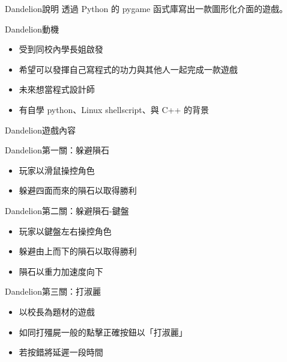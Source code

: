 \documentclass{article}
\begin{document}

\begin{large}
\begin{boxpar}{Dandelion}{說明}
透過 Python 的 pygame 函式庫寫出一款圖形化介面的遊戲。
\end{boxpar}
\begin{boxpar}{Dandelion}{動機}
    \begin{itemize}
\item 受到同校內學長姐啟發
\item 希望可以發揮自己寫程式的功力與其他人一起完成一款遊戲
\item 未來想當程式設計師
\item 有自學 python、Linux shellscript、與 C++ 的背景
    \end {itemize}
\end{boxpar}
\begin{boxpar}{Dandelion}{遊戲內容}
    \begin{boxpar}{Dandelion}{第一關：躲避隕石}
        \begin{itemize}
            \item 玩家以滑鼠操控角色
            \item 躲避四面而來的隕石以取得勝利
        \end{itemize}
    \end{boxpar}
    \begin{boxpar}{Dandelion}{第二關：躲避隕石-鍵盤}
   \begin{itemize}
        \item 玩家以鍵盤左右操控角色
        \item 躲避由上而下的隕石以取得勝利
        \item 隕石以重力加速度向下
   \end{itemize}
    \end{boxpar}
    \begin{boxpar}{Dandelion}{第三關：打淑麗}
   \begin{itemize}
        \item 以校長為題材的遊戲
        \item 如同打殭屍一般的點擊正確按鈕以「打淑麗」
        \item 若按錯將延遲一段時間
   \end{itemize}
    \end{boxpar}
 \end{boxpar}


\end{large}
\end{document}
